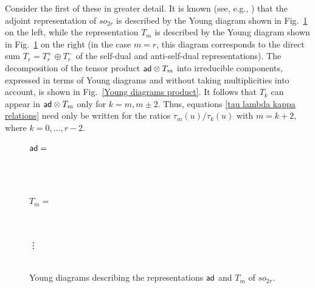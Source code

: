 \documentclass[a4paper]{article}
\newcommand{\ad}{{\sf ad}}
\renewcommand{\=}{\ =\ }
\newcommand{\tikznode}[3][inner sep=0pt]{\tikz[remember
picture,baseline=(#2.base)]{\node(#2)[#1]{$#3$};}}
\numberwithin{equation}{section}
\theoremstyle{remark}
\begin{document}
Consider the first of these in greater detail. It is known (see, e.g., \cite{IsRu2}) that the adjoint representation of $so_{2r}$ is described by the Young diagram shown in Fig.~\ref{Young diagrams for ad and T_m} on the left, while the representation $T_m$ is described by the Young diagram shown in Fig.~\ref{Young diagrams for ad and T_m} on the right (in the case $m=r$, this diagram corresponds to the direct sum $T_r=T_r^+\oplus T_r^-$ of the self-dual and anti-self-dual representations). The decomposition of the tensor product $\ad\otimes T_m$ into irreducible components, expressed in terms of Young diagrams and without taking multiplicities into account, is shown in Fig.~\ref{Young diagrams product}. It follows that $T_k$ can appear in $\ad\otimes T_m$ only for $k=m,m\pm 2$. Thus, equations \eqref{tau lambda kappa relations} need only be written for the ratios $\tau_m(u)/\tau_k(u)$ with $m=k+2$, where $k=0,\dots,r-2$.


\begin{figure}
\centering
$\ad=$
\begin{ytableau}
~ \\
~
\end{ytableau}%
\hspace{1.5cm}
$T_m=$\hspace{0.6cm}
\begin{ytableau}
\tikznode{1top}{~}\\
~\\
\vdots\\
~\\
\tikznode{1bottom}{~}
\end{ytableau}
\caption{Young diagrams describing the representations $\ad$ and $T_m$ of $so_{2r}$.}\label{Young diagrams for ad and T_m}
\end{figure}
\end{document}
